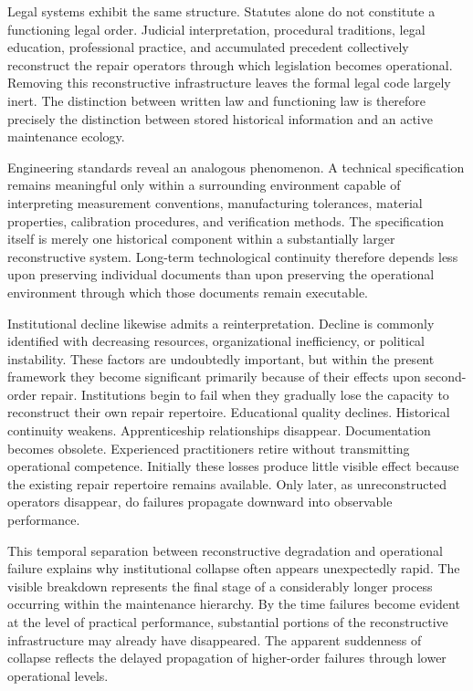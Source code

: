 \documentclass[12pt,oneside]{article}
\theoremstyle{plain}
\theoremstyle{definition}
\theoremstyle{remark}
\theoremstyle{plain}
\begin{document}
Legal systems exhibit the same structure. Statutes alone do not constitute a functioning legal
order. Judicial interpretation, procedural traditions, legal education, professional practice, and
accumulated precedent collectively reconstruct the repair operators through which legislation
becomes operational. Removing this reconstructive infrastructure leaves the formal legal code
largely inert. The distinction between written law and functioning law is therefore precisely the
distinction between stored historical information and an active maintenance ecology.

Engineering standards reveal an analogous phenomenon. A technical specification remains meaningful
only within a surrounding environment capable of interpreting measurement conventions,
manufacturing tolerances, material properties, calibration procedures, and verification methods.
The specification itself is merely one historical component within a substantially larger
reconstructive system. Long-term technological continuity therefore depends less upon preserving
individual documents than upon preserving the operational environment through which those documents
remain executable.

Institutional decline likewise admits a reinterpretation. Decline is commonly identified with
decreasing resources, organizational inefficiency, or political instability. These factors are
undoubtedly important, but within the present framework they become significant primarily because
of their effects upon second-order repair. Institutions begin to fail when they gradually lose the
capacity to reconstruct their own repair repertoire. Educational quality declines. Historical
continuity weakens. Apprenticeship relationships disappear. Documentation becomes obsolete.
Experienced practitioners retire without transmitting operational competence. Initially these losses
produce little visible effect because the existing repair repertoire remains available. Only later,
as unreconstructed operators disappear, do failures propagate downward into observable performance.

This temporal separation between reconstructive degradation and operational failure explains why
institutional collapse often appears unexpectedly rapid. The visible breakdown represents the final
stage of a considerably longer process occurring within the maintenance hierarchy. By the time
failures become evident at the level of practical performance, substantial portions of the
reconstructive infrastructure may already have disappeared. The apparent suddenness of collapse
reflects the delayed propagation of higher-order failures through lower operational levels.
\end{document}
